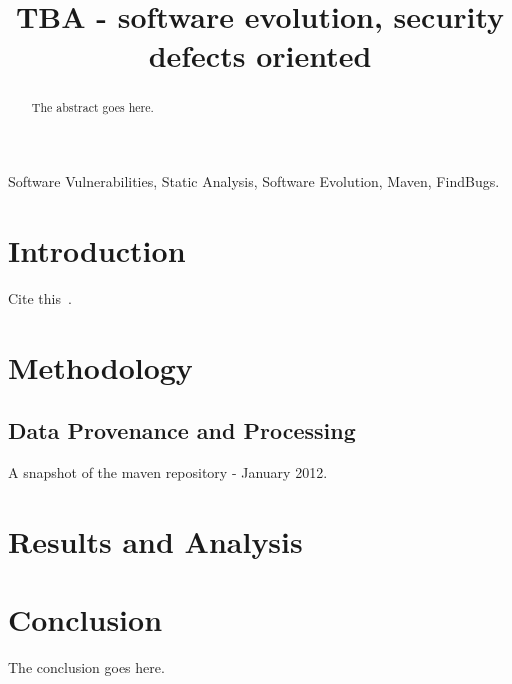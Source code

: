 \documentclass[conference]{IEEEtran}
\begin{document}
\title{TBA - software evolution, security defects oriented}


\author{
\and
{}
}

\maketitle

\begin{abstract}
The abstract goes here.
\end{abstract}

\begin{IEEEkeywords}
Software Vulnerabilities, Static Analysis, Software Evolution, Maven, FindBugs.
\end{IEEEkeywords}

\IEEEpeerreviewmaketitle

\section{Introduction}

Cite this~\cite{MNN11}.

\section{Methodology}
\label{sec:meth}

\subsection{Data Provenance and Processing}

A snapshot of the maven repository - January 2012.

\section{Results and Analysis}
\label{sec:res}

\section{Conclusion}
\label{sec:con}
The conclusion goes here.
\end{document}
